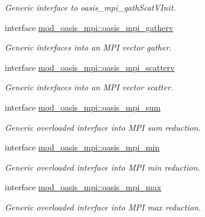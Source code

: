 \begin{DoxyCompactItemize}
\begin{DoxyCompactList}\small\item\em Generic interface to oasis\+\_\+mpi\+\_\+gath\+Scat\+V\+Init. \end{DoxyCompactList}\item 
interface \hyperlink{interfacemod__oasis__mpi_1_1oasis__mpi__gatherv}{mod\+\_\+oasis\+\_\+mpi\+::oasis\+\_\+mpi\+\_\+gatherv}
\begin{DoxyCompactList}\small\item\em Generic interfaces into an M\+P\+I vector gather. \end{DoxyCompactList}\item 
interface \hyperlink{interfacemod__oasis__mpi_1_1oasis__mpi__scatterv}{mod\+\_\+oasis\+\_\+mpi\+::oasis\+\_\+mpi\+\_\+scatterv}
\begin{DoxyCompactList}\small\item\em Generic interfaces into an M\+P\+I vector scatter. \end{DoxyCompactList}\item 
interface \hyperlink{interfacemod__oasis__mpi_1_1oasis__mpi__sum}{mod\+\_\+oasis\+\_\+mpi\+::oasis\+\_\+mpi\+\_\+sum}
\begin{DoxyCompactList}\small\item\em Generic overloaded interface into M\+P\+I sum reduction. \end{DoxyCompactList}\item 
interface \hyperlink{interfacemod__oasis__mpi_1_1oasis__mpi__min}{mod\+\_\+oasis\+\_\+mpi\+::oasis\+\_\+mpi\+\_\+min}
\begin{DoxyCompactList}\small\item\em Generic overloaded interface into M\+P\+I min reduction. \end{DoxyCompactList}\item 
interface \hyperlink{interfacemod__oasis__mpi_1_1oasis__mpi__max}{mod\+\_\+oasis\+\_\+mpi\+::oasis\+\_\+mpi\+\_\+max}
\begin{DoxyCompactList}\small\item\em Generic overloaded interface into M\+P\+I max reduction. \end{DoxyCompactList}\end{DoxyCompactItemize}
